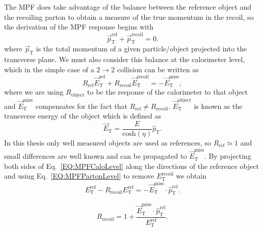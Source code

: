 The MPF does take advantage of the balance between the reference object and the recoiling parton to obtain a measure of the true momentum in the recoil, so the derivation of the MPF response begins with 
\begin{equation}
  \label{EQ:MPFPartonLevel}
  \vec{p}_{\mathrm T}^{\mathrm{ref}}+\vec{p}_{\mathrm T}^{\mathrm{recoil}} = 0.  
\end{equation}
\noindent
where $\vec{p}_{\mathrm T}$ is the total momentum of a given particle/object projected into the transverse plane.   
We must also consider this balance at the calorimeter level, which in the simple case of a $2\rightarrow$2 collision can be written as
\begin{equation}
  \label{EQ:MPFCaloLevel}
  R_{\mathrm{ref}}\vec{E}_{\mathrm T}^{\mathrm{ref}}+R_{\mathrm{recoil}}\vec{E}_{\mathrm T}^{\mathrm{recoil}}=-\vec{E}_{\mathrm T}^{\mathrm{miss}},
\end{equation}
\noindent
where we are using $R_{\mathrm{object}}$ to be the response of the calorimeter to that object and $\vec{E}_{\mathrm T}^{\mathrm{miss}}$ compensates for the fact that $R_{\mathrm{ref}} \neq R_{\mathrm{recoil}}$.  
$\vec{E}_{\mathrm T}^{\mathrm{object}}$ is known as the transverse energy of the object which is defined as
\begin{equation}
  \vec{E}_{\mathrm T}=\frac{E}{\mathrm{cosh}\left(\eta\right)}\hat{p}_{\mathrm T}.  
\end{equation}
\noindent
In this thesis only well measured objects are used as references, so $R_{\mathrm{ref}}\simeq1$ and small differences are well known and can be propagated to $\vec{E}_{\mathrm T}^{\mathrm{miss}}$.  
By projecting both sides of Eq.~\ref{EQ:MPFCaloLevel} along the directions of the reference object and using Eq.~\ref{EQ:MPFPartonLevel} to remove ${E}_{\mathrm T}^{\mathrm{recoil}}$ we obtain
\begin{equation}
  E_{\mathrm T}^{\mathrm{ref}}-R_{\mathrm{recoil}}E_{\mathrm T}^{\mathrm{ref}}=-\vec{E}_{\mathrm T}^{\mathrm{miss}}\cdot\hat{p}_{\mathrm T}^{\mathrm{ref}}.
\end{equation} 

\begin{equation}
  \label{EQ:MPFSimple}
  R_{\mathrm{recoil}}=1+\frac{\vec{E}_{\mathrm T}^{\mathrm{miss}}\cdot\hat{p}_{\mathrm T}^{\mathrm{ref}}}{E_{\mathrm T}^{\mathrm{ref}}}.
\end{equation}

